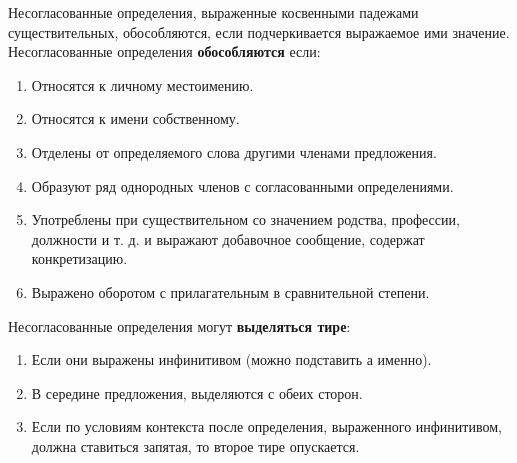 \documentclass[main]{subfiles}
\begin{document}
Несогласованные определения, выраженные косвенными падежами существительных, обособляются, если подчеркивается выражаемое ими значение. \newline
{} \newline
Несогласованные определения \textbf{обособляются} если:
\begin{enumerate}
      \item Относятся к личному местоимению. \newline
      \item Относятся к имени собственному. \newline
      \item Отделены от определяемого слова другими членами предложения. \newline
      \item Образуют ряд однородных членов с согласованными определениями. \newline
      \item Употреблены при существительном со значением родства, профессии, должности и т. д. и выражают добавочное сообщение, содержат конкретизацию. \newline
      \item Выражено оборотом с прилагательным в сравнительной степени. \newline
\end{enumerate}
Несогласованные определения могут \textbf{выделяться тире}:
\begin{enumerate}
      \item Если они выражены инфинитивом (можно подставить а именно).\newline
      \item В середине предложения, выделяются с обеих сторон.
      \item Если по условиям контекста после определения, выраженного инфинитивом, должна ставиться запятая, то второе тире опускается. \newline
\end{enumerate}
\end{document}

